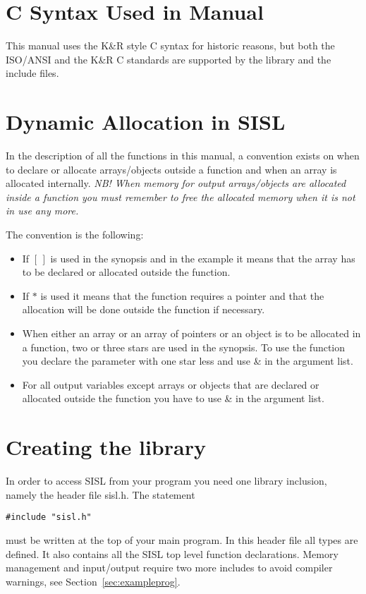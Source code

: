 
\section{\label{syntax}C Syntax Used in Manual}
This manual uses the K\&R style C syntax for historic reasons, but both
the ISO/ANSI and the K\&R C standards are supported by the library and
the include files.

\section{\label{dynamic}Dynamic Allocation in SISL}
In the description of all the functions in this manual, a
convention exists on when to declare or allocate arrays/objects outside a
function and when an array is allocated internally.
{\em NB! When memory for output arrays/objects are allocated inside a function you
must remember to free the allocated memory when it is not in use any
more.}

The convention is the following:
\begin{itemize}
\item If $[\,]$ is used in the synopsis and in the example it means
that the array has to be declared or allocated outside the function.
\item If $*$ is used it means that the function requires a
pointer and that the allocation will be done outside the function if necessary.
\item When either an array or an array of pointers or an object is to be
allocated in a function, two or three stars are used in the
synopsis.
To use the function you declare the parameter with one star less and use  \&
in the argument list.
\item For all output variables except arrays or objects
that are declared or allocated  outside the function you have to use \&
in the argument list.
\end{itemize}


\vfill
\newpage
\vfill
\newpage
\section{Creating the library}

In order to access SISL from your program you need one library inclusion, namely
the header file sisl.h. The statement
\begin{verbatim}
#include "sisl.h"
\end{verbatim}
must be written at the top of your main program.
In this header file all types
are defined.
It also contains all the
SISL top level function declarations.
Memory management and input/output require two more includes to avoid compiler warnings,
see Section~\ref{sec:exampleprog}.

